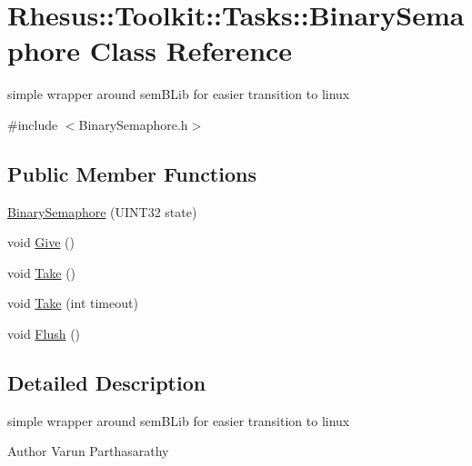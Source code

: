 \hypertarget{class_rhesus_1_1_toolkit_1_1_tasks_1_1_binary_semaphore}{\section{Rhesus\-:\-:Toolkit\-:\-:Tasks\-:\-:Binary\-Semaphore Class Reference}
\label{class_rhesus_1_1_toolkit_1_1_tasks_1_1_binary_semaphore}
}


simple wrapper around sem\-B\-Lib for easier transition to linux  




{\ttfamily \#include $<$Binary\-Semaphore.\-h$>$}

\subsection*{Public Member Functions}
\begin{DoxyCompactItemize}
\item 
\hyperlink{class_rhesus_1_1_toolkit_1_1_tasks_1_1_binary_semaphore_ad5cd5ebcc6e76cd731e3fa2475cbfff4}{Binary\-Semaphore} (U\-I\-N\-T32 state)
\item 
void \hyperlink{class_rhesus_1_1_toolkit_1_1_tasks_1_1_binary_semaphore_add97793126c118db4464416df28107a1}{Give} ()
\item 
void \hyperlink{class_rhesus_1_1_toolkit_1_1_tasks_1_1_binary_semaphore_aa73747d0e80b1792130be1a1d6f45525}{Take} ()
\item 
void \hyperlink{class_rhesus_1_1_toolkit_1_1_tasks_1_1_binary_semaphore_af7c12c6de6ebb9bfe46023b852015a5a}{Take} (int timeout)
\item 
void \hyperlink{class_rhesus_1_1_toolkit_1_1_tasks_1_1_binary_semaphore_ac9a0c9f49ef88360dad0741f20ed21a2}{Flush} ()
\end{DoxyCompactItemize}


\subsection{Detailed Description}
simple wrapper around sem\-B\-Lib for easier transition to linux 

\begin{DoxyAuthor}{Author}
Varun Parthasarathy 
\end{DoxyAuthor}


